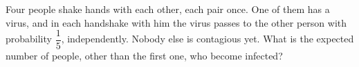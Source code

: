 Four people shake hands with each other, each pair once. One of them has a virus, and in each handshake with him the virus passes to the other person with probability $\dfrac15$, independently. Nobody else is contagious yet. What is the expected number of people, other than the first one, who become infected?
